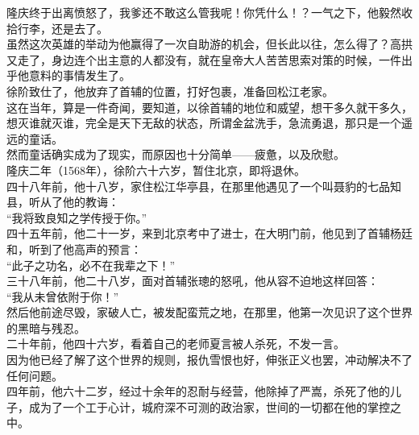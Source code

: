 \begin{multicols}{\theparacolNo}
隆庆终于出离愤怒了，我爹还不敢这么管我呢！你凭什么！？一气之下，他毅然收拾行李，还是去了。\\

虽然这次英雄的举动为他赢得了一次自助游的机会，但长此以往，怎么得了？高拱又走了，身边连个出主意的人都没有，就在皇帝大人苦苦思索对策的时候，一件出乎他意料的事情发生了。\\

徐阶致仕了，他放弃了首辅的位置，打好包裹，准备回松江老家。\\

这在当年，算是一件奇闻，要知道，以徐首辅的地位和威望，想干多久就干多久，想灭谁就灭谁，完全是天下无敌的状态，所谓金盆洗手，急流勇退，那只是一个遥远的童话。\\

然而童话确实成为了现实，而原因也十分简单——疲惫，以及欣慰。\\

隆庆二年（1568年），徐阶六十六岁，暂住北京，即将退休。\\

四十八年前，他十八岁，家住松江华亭县，在那里他遇见了一个叫聂豹的七品知县，听从了他的教诲：\\

“我将致良知之学传授于你。”\\

四十五年前，他二十一岁，来到北京考中了进士，在大明门前，他见到了首辅杨廷和，听到了他高声的预言：\\

“此子之功名，必不在我辈之下！”\\

三十八年前，他二十八岁，面对首辅张璁的怒吼，他从容不迫地这样回答：\\

“我从未曾依附于你！”\\

然后他前途尽毁，家破人亡，被发配蛮荒之地，在那里，他第一次见识了这个世界的黑暗与残忍。\\

二十年前，他四十六岁，看着自己的老师夏言被人杀死，不发一言。\\

因为他已经了解了这个世界的规则，报仇雪恨也好，伸张正义也罢，冲动解决不了任何问题。\\

四年前，他六十二岁，经过十余年的忍耐与经营，他除掉了严嵩，杀死了他的儿子，成为了一个工于心计，城府深不可测的政治家，世间的一切都在他的掌控之中。\\


\end{multicols}
